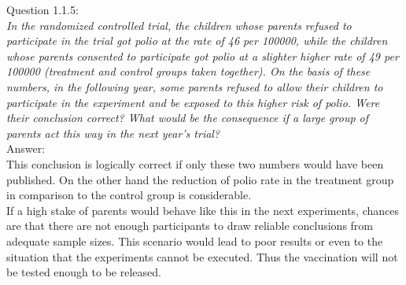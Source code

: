 
Question 1.1.5:\\	
\textsl{In the randomized controlled trial, the children whose parents refused to participate in the trial got polio at the rate of 46 per 100000, while the children whose parents consented to participate got polio at a slighter higher rate of 49 per 100000 (treatment and control groups taken together). On the basis of these numbers, in the following year, some parents refused to allow their children to participate in the experiment and be exposed to this higher risk of polio. Were their conclusion correct? What would be the consequence if a large group of parents act this way in the next year's trial?}\\

Answer:\\
This conclusion is logically correct if only these two numbers would have been published. On the other hand the reduction of polio rate in the treatment group in comparison to the control group is considerable.\\

If a high stake of parents would behave like this in the next experiments, chances are that there are not enough participants to draw reliable conclusions from adequate sample sizes. This scenario would lead to poor results or even to the situation that the experiments cannot be executed. Thus the vaccination will not be tested enough to be released.\\

